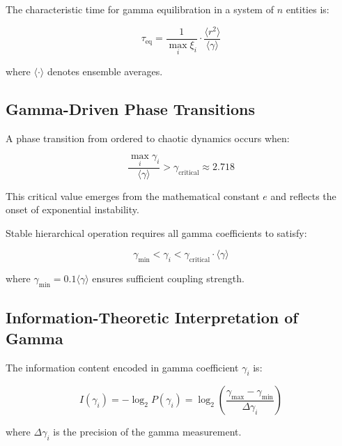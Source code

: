 \begin{theorem}
The characteristic time for gamma equilibration in a system of $n$ entities is:

\begin{equation}
\tau_{\text{eq}} = \frac{1}{\max_i \xi_i} \cdot \frac{\langle r^2 \rangle}{\langle \gamma \rangle}
\end{equation}

where $\langle \cdot \rangle$ denotes ensemble averages.
\end{theorem}

\subsection{Gamma-Driven Phase Transitions}

\begin{theorem}
A phase transition from ordered to chaotic dynamics occurs when:

\begin{equation}
\frac{\max_i \gamma_i}{\langle \gamma \rangle} > \gamma_{\text{critical}} \approx 2.718
\end{equation}

This critical value emerges from the mathematical constant $e$ and reflects the onset of exponential instability.
\end{theorem}

\begin{corollary}
Stable hierarchical operation requires all gamma coefficients to satisfy:

\begin{equation}
\gamma_{\min} < \gamma_i < \gamma_{\text{critical}} \cdot \langle \gamma \rangle
\end{equation}

where $\gamma_{\min} = 0.1 \langle \gamma \rangle$ ensures sufficient coupling strength.
\end{corollary}

\subsection{Information-Theoretic Interpretation of Gamma}

\begin{definition}
The information content encoded in gamma coefficient $\gamma_i$ is:

\begin{equation}
I(\gamma_i) = -\log_2 P(\gamma_i) = \log_2 \left(\frac{\gamma_{\max} - \gamma_{\min}}{\Delta \gamma_i}\right)
\end{equation}

where $\Delta \gamma_i$ is the precision of the gamma measurement.
\end{definition}

